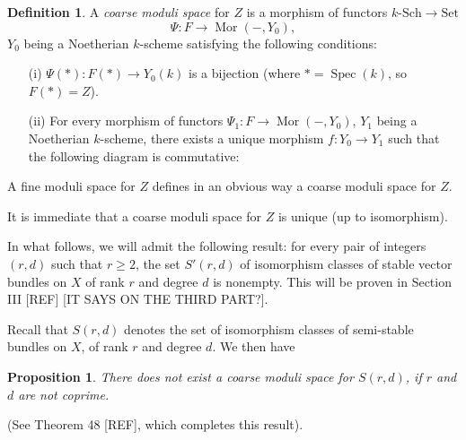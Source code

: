 \documentclass[12pt,a4paper]{book}
\DeclareMathOperator\Mor{Mor}
\DeclareMathOperator\Spec{Spec}
\def\kSch{k\text{-}\mathrm{Sch}}
\def\Set{\mathrm{Set}}
\newtheorem{prop}[thm]{Proposition}
\theoremstyle{definition} \newtheorem{defn}[thm]{Definition}
\theoremstyle{definition} \newtheorem{ejs}[thm]{Examples}
\theoremstyle{definition} \newtheorem{ej}[thm]{Example}
\begin{document}
  \begin{defn} \label{1.14}
    A \emph{coarse moduli space} for $Z$ is a morphism of functors $\kSch \rightarrow \Set$
    \begin{equation*}
      \Psi: F \longrightarrow \Mor(-,Y_0),
    \end{equation*}
    $Y_0$ being a Noetherian $k$-scheme satisfying the following conditions:
    \begin{itemize}
      \item[(i)] $\Psi(*):F(*)\rightarrow Y_0(k)$ is a bijection (where $*=\Spec(k)$, so $F(*)=Z$).
      \item[(ii)] For every morphism of functors $\Psi_1:F\rightarrow \Mor(-,Y_0)$, $Y_1$ being a Noetherian $k$-scheme, there exists a unique morphism $f:Y_0\rightarrow Y_1$ such that the following diagram is commutative:
	\begin{center}
	\end{center}
    \end{itemize}
  \end{defn}

  A fine moduli space for $Z$ defines in an obvious way a coarse moduli space for $Z$.

  It is immediate that a coarse moduli space for $Z$ is unique (up to isomorphism).

  In what follows, we will admit the following result: for every pair of integers $(r,d)$ such that $r\geq 2$, the set $S'(r,d)$ of isomorphism classes of stable vector bundles on $X$ of rank $r$ and degree $d$ is nonempty. This will be proven in Section III [REF] [IT SAYS ON THE THIRD PART?].

  Recall that $S(r,d)$ denotes the set of isomorphism classes of semi-stable bundles on $X$, of rank $r$ and degree $d$. We then have
  \begin{prop}\label{1.15}
    There does not exist a coarse moduli space for $S(r,d)$, if $r$ and $d$ are not coprime. 
  \end{prop}
    (See Theorem 48 [REF], which completes this result).
\end{document}
